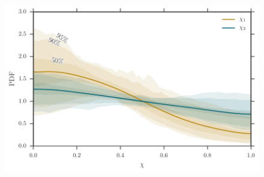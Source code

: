 \documentclass[iop,apj,twocolumn,twocolappendix,numberedappendix]{emulateapj}
\begin{document}


\begin{figure}
  \centering
  \includegraphics[width=0.95\columnwidth]{spin_cred_regionsspin_cred_regions}
  \caption{\protect}
\end{figure}


\end{document}
